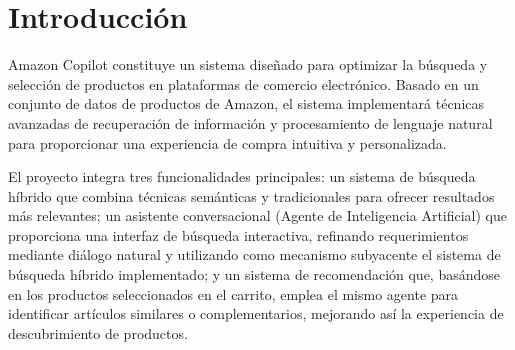 \section{Introducción}
Amazon Copilot constituye un sistema diseñado para optimizar la búsqueda y selección de productos en plataformas de comercio electrónico. Basado en un conjunto de datos de productos de Amazon, el sistema implementará técnicas avanzadas de recuperación de información y procesamiento de lenguaje natural para proporcionar una experiencia de compra intuitiva y personalizada.

El proyecto integra tres funcionalidades principales: un sistema de búsqueda híbrido que combina técnicas semánticas y tradicionales para ofrecer resultados más relevantes; un asistente conversacional (Agente de Inteligencia Artificial) que proporciona una interfaz de búsqueda interactiva, refinando requerimientos mediante diálogo natural y utilizando como mecanismo subyacente el sistema de búsqueda híbrido implementado; y un sistema de recomendación que, basándose en los productos seleccionados en el carrito, emplea el mismo agente para identificar artículos similares o complementarios, mejorando así la experiencia de descubrimiento de productos.

